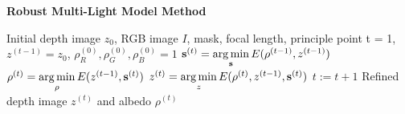 \begin{algorithm}[!htbp]
    \begin{algorithmic}[1] 
          \caption{\textbf{Robust Multi-Light Model Method}}
        \label{alg:robust}
         \renewcommand{\algorithmicrequire}{\textbf{Input:}}
         \renewcommand{\algorithmicensure}{\textbf{Output:}}
         \REQUIRE Initial depth image $z_0$, RGB image $I$, mask, focal length, principle point
         \vspace{1.8mm}
         \STATE t = 1, $z^{(t-1)} = z_0$, $\rho^{(0)}_R, \rho^{(0)}_G, \rho^{(0)}_B = 1$
         \vspace{1.8mm}
               \vspace{1.8mm}
                \STATE $\mathbf{s}^{(t)} = \operatorname*{arg\,min} \limits_{\mathbf{s}} E(\rho^{(t-1)}, z^{(t-1)})$ 
            \STATE $\rho^{(t)} = \operatorname*{arg\,min} \limits_{\rho} E(z^{(t-1)}, \mathbf{s}^{(t)})$ 
              \STATE $z^{(t)} = \operatorname*{arg\,min} \limits_{z} E(\rho^{(t)}, z^{(t-1)}, \mathbf{s}^{(t)})$ 
              \vspace{1.8mm}
                  \STATE $t := t + 1$
         \vspace{1.8mm}
          \ENDWHILE
          \ENSURE  Refined depth image $z^{(t)}$ and albedo $\rho^{(t)}$
    \end{algorithmic}
\end{algorithm}




